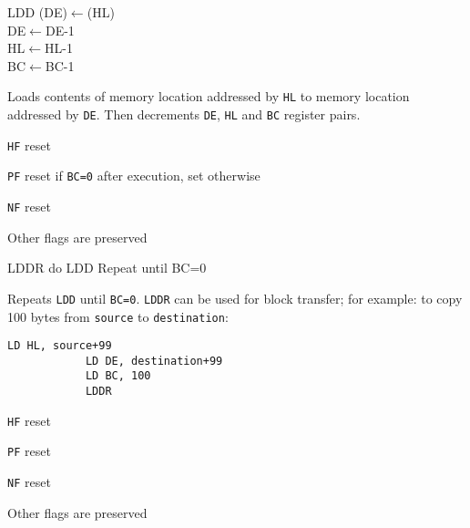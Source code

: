\documentclass[twoside,openright,a4paper]{book}
\begin{document}
\begin{basedescript}{
	\desclabelstyle{\multilinelabel}
	\desclabelwidth{3cm}}
	\begin{detailitem}{LDD}
		{(DE)$\leftarrow$(HL)\\
		DE$\leftarrow$DE-1\\
		HL$\leftarrow$HL-1\\
		BC$\leftarrow$BC-1}

		Loads contents of memory location addressed by {\tt HL} to memory location addressed by {\tt DE}. Then decrements {\tt DE}, {\tt HL} and {\tt BC} register pairs.

		\begin{DetailEffects}
			\item {\tt HF} reset
			\item {\tt PF} reset if {\tt BC=0} after execution, set otherwise
			\item {\tt NF} reset
			\item Other flags are preserved
		\end{DetailEffects}
				
		\begin{DetailTiming}
		\end{DetailTiming}

	\end{detailitem}

	\pagebreak
	\begin{detailitem}{LDDR}
		{do LDD
		Repeat until BC=0}

		Repeats {\tt LDD} until {\tt BC=0}. {\tt LDDR} can be used for block transfer; for example: to copy 100 bytes from {\tt source} to {\tt destination}:

		\begin{Verbatim}[gobble=3]
			LD HL, source+99
			LD DE, destination+99
			LD BC, 100
			LDDR
		\end{Verbatim}

		\begin{DetailEffects}
			\item {\tt HF} reset
			\item {\tt PF} reset
			\item {\tt NF} reset
			\item Other flags are preserved
		\end{DetailEffects}
				
		\begin{DetailTiming}
			\DetailTime{BC=0}{4}{16}
			\DetailTime{BC$\not=$0}{5}{21}
		\end{DetailTiming}

	\end{detailitem}


\end{basedescript}
\end{document}
